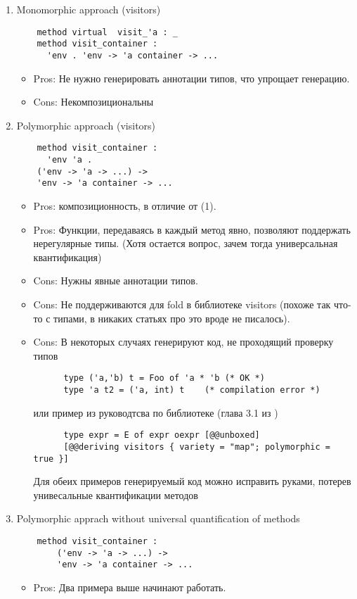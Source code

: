 \documentclass[acmsmall,review,anonymous]{acmart}\settopmatter{printfolios=true,printccs=false,printacmref=false}
\begin{document}
\begin{enumerate}

 \item Monomorphic approach (visitors)
    \begin{lstlisting}
    method virtual  visit_'a : _
    method visit_container :
      'env . 'env -> 'a container -> ...
    \end{lstlisting}
    \begin{itemize}
    \item Pros: Не нужно генерировать аннотации типов, что упрощает генерацию.
    \item Cons: Некомпозициональны
    \end{itemize}
    
  \item Polymorphic approach (visitors)
    \begin{lstlisting}
    method visit_container :
      'env 'a .
	('env -> 'a -> ...) ->
	'env -> 'a container -> ...
    \end{lstlisting}
    \begin{itemize}
    \item Pros: композиционность,  в отличие от (1).
    \item Pros: Функции, передаваясь в каждый метод явно, позволяют поддержать нерегулярные типы. 
    (Хотя остается вопрос, зачем тогда универсальная квантификация)
    \item Cons: Нужны явные аннотации типов.
    \item Cons: Не поддерживаются для fold в библиотеке visitors (похоже так что-то с типами, в никаких статьях про это вроде не писалось).
    \item Cons: В некоторых случаях генерируют код, не проходящий проверку типов
	  \begin{lstlisting}
	  type ('a,'b) t = Foo of 'a * 'b (* OK *)
	  type 'a t2 = ('a, int) t    (* compilation error *)
	  \end{lstlisting}
	  или пример из руководтсва по библиотеке (глава 3.1 из \cite{visitors_manual})
	  \begin{lstlisting}
	  type expr = E of expr oexpr [@@unboxed]
	  [@@deriving visitors { variety = "map"; polymorphic = true }]
	  \end{lstlisting}
	  Для обеих примеров генерируемый код можно исправить руками, потерев унивесальные квантификации методов
    \end{itemize}
  \item Polymorphic apprach without universal quantification of methods
      \begin{lstlisting}
	method visit_container :
	    ('env -> 'a -> ...) ->
	    'env -> 'a container -> ...
    \end{lstlisting}
    \begin{itemize}
    \item Pros: Два примера выше начинают работать.
    \end{itemize}
    

\end{enumerate}
\end{document}

